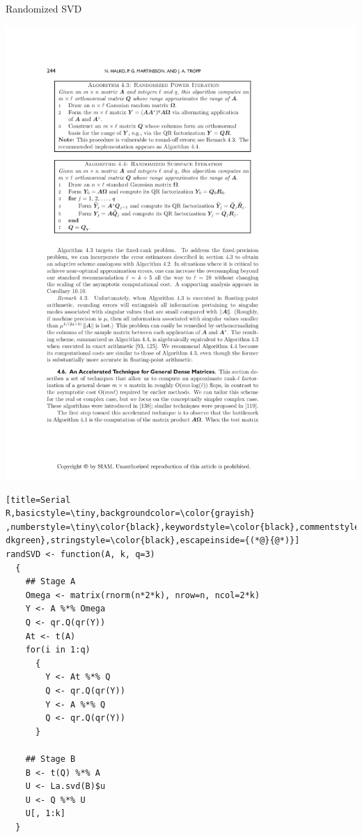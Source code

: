 \begin{frame}[fragile]
\begin{block}{Randomized SVD\footnotemark}
\begin{minipage}{.51\textwidth}
\begin{center}
      \includegraphics[width=.95\textwidth]{pics/randSVDalg4_4}
    \end{center}
  \end{minipage}
  \begin{minipage}{0.471\textwidth}
\begin{lstlisting}[title=Serial 
R,basicstyle=\tiny,backgroundcolor=\color{grayish} 
,numberstyle=\tiny\color{black},keywordstyle=\color{black},commentstyle=\color{ 
dkgreen},stringstyle=\color{black},escapeinside={(*@}{@*)}]
randSVD <- function(A, k, q=3)
  {
    ## Stage A
    Omega <- matrix(rnorm(n*2*k), nrow=n, ncol=2*k)
    Y <- A %*% Omega
    Q <- qr.Q(qr(Y))
    At <- t(A)
    for(i in 1:q)
      {
        Y <- At %*% Q
        Q <- qr.Q(qr(Y))
        Y <- A %*% Q
        Q <- qr.Q(qr(Y))
      }
    
    ## Stage B
    B <- t(Q) %*% A
    U <- La.svd(B)$u
    U <- Q %*% U
    U[, 1:k]
  }
\end{lstlisting}
  \end{minipage}
\end{block}
\end{frame}






